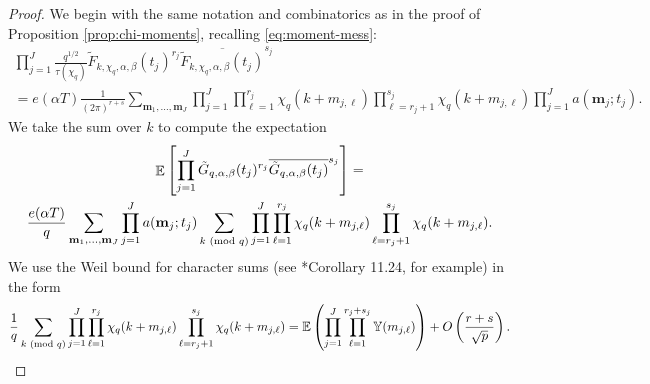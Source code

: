 \documentclass[12pt, a4paper]{amsart}
\theoremstyle{remark}
\renewcommand{\mod}[1]{{\ifmmode\text{\rm\ (mod~$#1$)}\else\discretionary{}{}{\hbox{ }}\rm(mod~$#1$)\fi}}
\newcommand{\bY}{\mathbb{Y}}
\newcommand{\bm}{\mathbf{m}}
\newcommand{\bE}{\mathbb{E}}
\DeclareMathOperator{\E}{\mathbb{E}}
\begin{document}
\begin{proof}
    We begin with the same notation and combinatorics as in the proof of
    Proposition \ref{prop:chi-moments}, recalling 
    \eqref{eq:moment-mess}:
\begin{multline*}
    \prod_{j=1}^J \frac{q^{1/2}}{\tau(\chi_q)} \tilde F_{k,\chi_q,\alpha,\beta}(t_j)^{r_j} \overline{\tilde F_{k,\chi_q,\alpha,\beta}(t_j)}^{s_j}
    \\
    =
    e(\alpha T)
    \frac{1}{(2\pi)^{r+s}}
 \sum_{\bm_1, \dots, \bm_J}
 \prod_{j=1}^J\prod_{\ell=1}^{r_j}\chi_q(k + m_{j,\ell})
 \prod_{\ell=r_j + 1}^{s_j}\chi_q(k + m_{j,\ell})
 \prod_{j=1}^J a(\bm_j; t_j).
\end{multline*}
We take the sum over $k$ to compute the expectation
\begin{multline*}
\E \left[ \prod_{j=1}^J \tilde G_{q,\alpha,\beta}(t_j)^{r_j} \overline{\tilde G_{q,\alpha,\beta}(t_j)}^{s_j} \right] = \\
 \frac{e(\alpha T)}{q}
 \sum_{\bm_1, \dots, \bm_J}
 \prod_{j=1}^J a(\bm_j; t_j)
 \sum_{k \mod q}
 \prod_{j=1}^J\prod_{\ell=1}^{r_j}\chi_q(k + m_{j,\ell})
 \prod_{\ell=r_j + 1}^{s_j}\chi_q(k + m_{j,\ell}).
\end{multline*}
We use the Weil bound for character sums (see \cite{IwKo}*{Corollary 11.24},
for example) in the form
\[
 \frac{1}{q}
 \sum_{k \mod q}
 \prod_{j=1}^J\prod_{\ell=1}^{r_j}\chi_q(k + m_{j,\ell})
 \prod_{\ell=r_j + 1}^{s_j}\chi_q(k + m_{j,\ell})
 =
\bE\left(\prod_{j=1}^J\prod_{\ell=1}^{r_j+s_j} \bY(m_{j, \ell})\right) +
O\left(\frac{r+s}{\sqrt{p}}\right).
\]


\end{proof}
\end{document}
